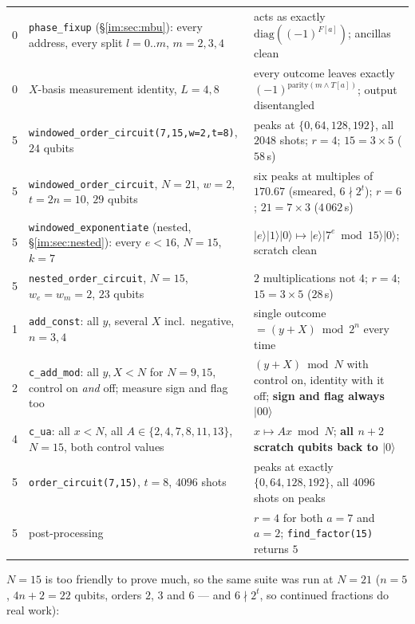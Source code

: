 \documentclass[11pt]{article}
\renewcommand{\ket}[1]{\lvert #1 \rangle}
\newcommand{\code}[1]{\texttt{#1}}
\theoremstyle{plain}
\theoremstyle{remark}
\begin{document}
\begin{center}
\begin{tabular}{@{}lp{}p{}@{}}
0 & \code{phase\_fixup} (\S\ref{im:sec:mbu}): every address, every split $l=0..m$, $m=2,3,4$
  & acts as exactly $\mathrm{diag}((-1)^{F[a]})$; ancillas clean\\[2pt]
0 & $X$-basis measurement identity, $L=4,8$
  & every outcome leaves exactly $(-1)^{\mathrm{parity}(m\wedge T[a])}$; output disentangled\\[2pt]
5 & \code{windowed\_order\_circuit(7,15,w=2,t=8)}, $24$ qubits
  & peaks at $\{0,64,128,192\}$, all $2048$ shots; $r=4$; $15=3\times5$ ($58$\,s)\\[2pt]
5 & \code{windowed\_order\_circuit}, $N{=}21$, $w{=}2$, $t{=}2n{=}10$, $29$ qubits
  & six peaks at multiples of $170.67$ (smeared, $6\nmid2^t$); $r=6$; $21=7\times3$ ($4\,062$\,s)\\[2pt]
5 & \code{windowed\_exponentiate} (nested, \S\ref{im:sec:nested}): every $e<16$, $N=15$, $k=7$
  & $\ket e\ket1\ket0\mapsto\ket e\ket{7^e\bmod15}\ket0$; scratch clean\\[2pt]
5 & \code{nested\_order\_circuit}, $N{=}15$, $w_e{=}w_m{=}2$, $23$ qubits
  & $2$ multiplications not $4$; $r=4$; $15=3\times5$ ($28$\,s)\\[2pt]
1 & \code{add\_const}: all $y$, several $X$ incl.\ negative, $n=3,4$
  & single outcome $=(y+X)\bmod2^n$ every time\\[2pt]
2 & \code{c\_add\_mod}: all $y,X<N$ for $N=9,15$, control on \emph{and} off; measure sign and flag too
  & $(y+X)\bmod N$ with control on, identity with it off; \textbf{sign and flag always $\ket{00}$}\\[2pt]
4 & \code{c\_ua}: all $x<N$, all $A\in\{2,4,7,8,11,13\}$, $N=15$, both control values
  & $x\mapsto Ax\bmod N$; \textbf{all $n+2$ scratch qubits back to $\ket0$}\\[2pt]
5 & \code{order\_circuit(7,15)}, $t=8$, $4096$ shots
  & peaks at exactly $\{0,64,128,192\}$, all $4096$ shots on peaks\\[2pt]
5 & post-processing & $r=4$ for both $a=7$ and $a=2$; \code{find\_factor(15)} returns $5$\\
\bottomrule
\end{tabular}
\end{center}

\medskip\noindent
$N=15$ is too friendly to prove much, so the same suite was run at \textbf{$N=21$} ($n=5$,
$4n+2=22$ qubits, orders $2$, $3$ and $6$ --- and $6\nmid2^t$, so continued fractions do real
work):
\end{document}
